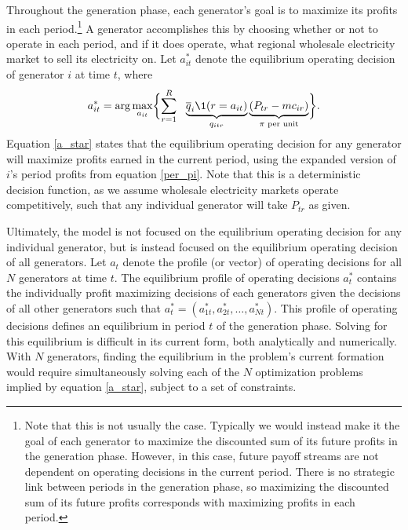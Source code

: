 Throughout the generation phase, each generator's goal is to maximize its profits in each period.\footnote{Note that this is not usually the case. Typically we would instead make it the goal of each generator to maximize the discounted sum of its future profits in the generation phase. However, in this case, future payoff streams are not dependent on operating decisions in the current period. There is no strategic link between periods in the generation phase, so maximizing the discounted sum of its future profits corresponds with maximizing profits in each period.} A generator accomplishes this by choosing whether or not to operate in each period, and if it does operate, what regional wholesale electricity market to sell its electricity on. Let $a_{it}^*$ denote the equilibrium operating decision of generator $i$ at time $t$, where
\begin{equation}\label{a_star}
    a_{it}^* = \arg\max_{a_{it}} \biggl\{ \sum_{r=1}^R ~~\underbrace{\overline{q}_i \1(r = a_{it})}_{q_{itr}} \underbrace{(P_{tr} - mc_{ir})}_\text{$\pi$ per unit} \biggr\}.
\end{equation}
Equation \eqref{a_star} states that the equilibrium operating decision for any generator will maximize profits earned in the current period, using the expanded version of $i$'s period profits from equation \eqref{per_pi}. Note that this is a deterministic decision function, as we assume wholesale electricity markets operate competitively, such that any individual generator will take $P_{tr}$ as given. 

Ultimately, the model is not focused on the equilibrium operating decision for any individual generator, but is instead focused on the equilibrium operating decision of all generators. Let $a_t$ denote the profile (or vector) of operating decisions for all $N$ generators at time $t$. The equilibrium profile of operating decisions $a_t^*$ contains the individually profit maximizing decisions of each generators given the decisions of all other generators such that $a_t^* = (a_{1t}^*, a_{2t}^*, \ldots, a_{Nt}^*)$. This profile of operating decisions defines an equilibrium in period $t$ of the generation phase. Solving for this equilibrium is difficult in its current form, both analytically and numerically. With $N$ generators, finding the equilibrium in the problem's current formation would require simultaneously solving each of the $N$ optimization problems implied by equation \eqref{a_star}, subject to a set of constraints. 

